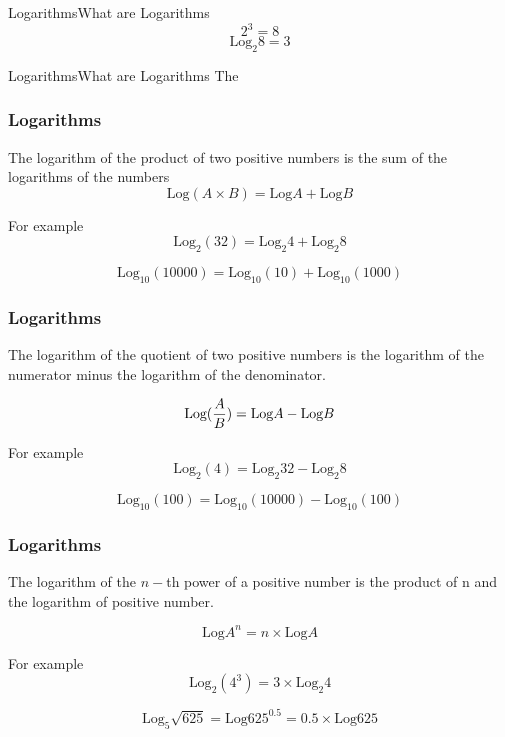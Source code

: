 \documentclass{beamer}
\begin{document}


\begin{frame}{Logarithms}{What are Logarithms}
\Large
\[ 2^3 =8 \]
\[ \mbox{Log}_2 8 = 3 \]

\end{frame}


\begin{frame}{Logarithms}{What are Logarithms}
\Large
The

\end{frame}

\begin{frame}
\frametitle{Logarithms}
\Large
The logarithm of the product of two positive numbers is the sum of the logarithms of the numbers
\[ \mbox{Log}(A\times B) =  \mbox{Log}A +  \mbox{Log}B \]

For example
\[ \mbox{Log}_2(32) =  \mbox{Log}_2 4 +  \mbox{Log}_2 8 \]

\[ \mbox{Log}_{10}(10000) =  \mbox{Log}_{10}(10) +  \mbox{Log}_{10}(1000) \]

\end{frame}
\begin{frame}
\frametitle{Logarithms}
\Large

The logarithm of the quotient of two positive numbers is the logarithm of the numerator minus the logarithm of the 
denominator.

\[ \mbox{Log}( {A \over B} ) =  \mbox{Log}A -  \mbox{Log}B \]

For example
\[ \mbox{Log}_2(4) =  \mbox{Log}_2 32 -  \mbox{Log}_2 8 \]

\[ \mbox{Log}_{10}(100) =  \mbox{Log}_{10}(10000) -  \mbox{Log}_{10}(100) \]


\end{frame}
\begin{frame}
\frametitle{Logarithms}
\Large
The logarithm of the $n-$th power of a positive number is the product of n and the logarithm of positive number.

\[ \mbox{Log}A^n =  n\times \mbox{Log}A  \]

For example
\[ \mbox{Log}_2(4^3) =  3 \times \mbox{Log}_2 4 \]

\[ \mbox{Log}_5 \sqrt{625} =  \mbox{Log}625^{0.5} =  0.5 \times \mbox{Log} 625 \]

\end{frame}
\end{document}
